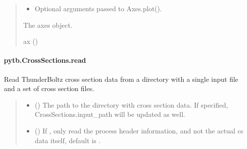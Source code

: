 \documentclass[letterpaper,10pt,english,openany,oneside]{sphinxmanual}
\begin{document}
\begin{fulllineitems}
\begin{fulllineitems}
\begin{quote}
\begin{description}
\begin{itemize}
\item {} 
\sphinxAtStartPar
{} \textendash{} Optional arguments passed to Axes.plot().

\end{itemize}

\sphinxAtStartPar
The axes object.

\sphinxAtStartPar
ax ()

\end{description}\end{quote}

\end{fulllineitems}


\sphinxstepscope


\paragraph{pytb.CrossSections.read}
\label{\detokenize{api/pytb.CrossSections.read:pytb-crosssections-read}}\label{\detokenize{api/pytb.CrossSections.read::doc}}

\begin{fulllineitems}
\label{\detokenize{api/pytb.CrossSections.read:pytb.CrossSections.read}}
\pysigstartsignatures
{}
\pysigstopsignatures
\sphinxAtStartPar
Read ThunderBoltz cross section data from a directory with a
single input file and a set of cross section files.
\begin{quote}\begin{description}
\begin{itemize}
\item {} 
\sphinxAtStartPar
{} () \textendash{} The path to the directory
with cross section data. If specified, CrossSections.input\_path
will be updated as well.

\item {} 
\sphinxAtStartPar
{} () \textendash{} If , only read the process header
information, and not the actual cs data itself, default
is .


\end{itemize}
\end{description}
\end{quote}
\end{fulllineitems}
\end{fulllineitems}
\end{document}
